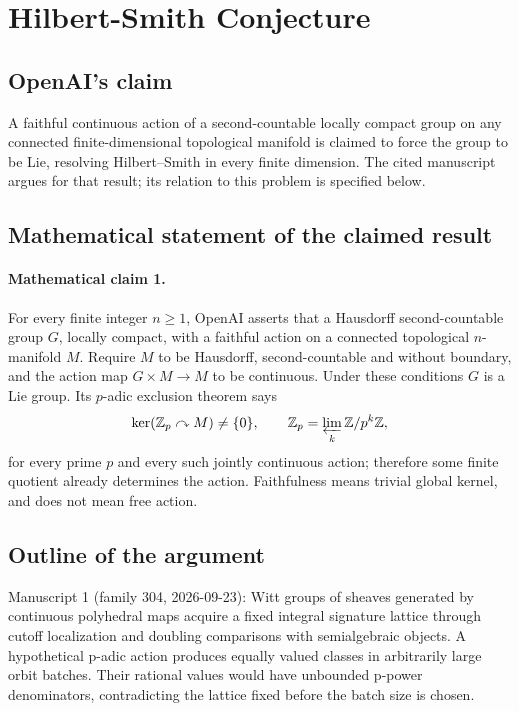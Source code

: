 \documentclass[11pt]{article}
\begin{document}
\section*{Hilbert-Smith Conjecture}

\subsection{OpenAI's claim}
A faithful continuous action of a second-countable locally compact group on any connected finite-dimensional topological manifold is claimed to force the group to be Lie, resolving Hilbert--Smith in every finite dimension. The cited manuscript argues for that result; its relation to this problem is specified below.

\subsection{Mathematical statement of the claimed result}
\paragraph{Mathematical claim 1.} For every finite integer $n\ge1$, OpenAI asserts that a Hausdorff second-countable group $G$, locally compact, with a faithful action on a connected topological $n$-manifold $M$. Require $M$ to be Hausdorff, second-countable and without boundary, and the action map $G\times M\to M$ to be continuous. Under these conditions $G$ is a Lie group. Its $p$-adic exclusion theorem says
\[
\ker(\mathbb Z_p\curvearrowright M)\ne\{0\},\qquad
\mathbb Z_p=\varprojlim_k\mathbb Z/p^k\mathbb Z,
\]
for every prime $p$ and every such jointly continuous action; therefore some finite quotient already determines the action. Faithfulness means trivial global kernel, and does not mean free action.

\subsection{Outline of the argument}
Manuscript 1 (family 304, 2026-09-23): Witt groups of sheaves generated by continuous polyhedral maps acquire a fixed integral signature lattice through cutoff localization and doubling comparisons with semialgebraic objects. A hypothetical p-adic action produces equally valued classes in arbitrarily large orbit batches. Their rational values would have unbounded p-power denominators, contradicting the lattice fixed before the batch size is chosen.
\end{document}
